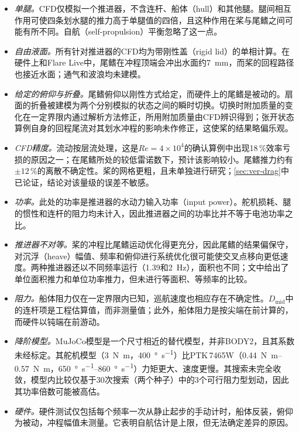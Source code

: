 \begin{itemize}
  \item \emph{单腿。}CFD仅模拟一个推进器，不含连杆、船体（hull）和其他腿。腿间相互作用可使四条划水腿的推力高于单腿值的四倍\cite{Wang2025}，且这种作用在桨与尾鳍之间可能有所不同。自航（self-propulsion）平衡忽略了这一点。
  \item \emph{自由液面。}所有针对推进器的CFD均为带刚性盖（rigid lid）的单相计算。在硬件上和Flare Live中，尾鳍在冲程顶端会冲出水面约\SI{7}{\milli\metre}，而桨的回程路径也接近水面；通气和波浪均未建模。
  \item \emph{给定的俯仰与折叠。}尾鳍俯仰以刚性方式给定，而硬件上的尾鳍是被动的。扇面的折叠被建模为两个分别模拟的状态之间的瞬时切换。切换时附加质量的变化在一定界限内通过解析方法修正，所用附加质量由CFD辨识得到；张开状态算例自身的回程尾流对其划水冲程的影响未作修正，这使桨的结果略偏乐观。
  \item \emph{CFD精度。}流动按层流处理，这是$\mathit{Re}=4\times10^4$的确认算例中出现18\,\%效率亏损的原因之一；在尾鳍所处的较低雷诺数下，预计该影响较小。尾鳍推力约有$\pm12$\,\%的离散不确定性。桨的网格更粗，且未单独进行研究；\cref{sec:ver-drag}中已论证，结论对该量级的误差不敏感。
  \item \emph{功率。}此处的功率是推进器的水动力输入功率（input power）。舵机损耗、腿的惯性和连杆的阻力均未计入，因此推进器之间的功率比并不等于电池功率之比。
  \item \emph{推进器不对等。}桨的冲程比尾鳍运动优化得更充分，因此尾鳍的结果偏保守，对沉浮（heave）幅值、频率和俯仰进行系统优化很可能使交叉点移向更低速度。两种推进器还以不同频率运行（\SI{1.39}{}和\SI{2}{\hertz}），面积也不同；文中给出了单位面积推力和单位功率推力，但未进行等面积、等频率的比较。
  \item \emph{阻力。}船体阻力仅在一定界限内已知，巡航速度也相应存在不确定性。$D_\text{mid}$中的连杆项是工程估算值，而非测量值；此外，船体阻力是按尖端在前计算的，而硬件以钝端在前游动。
  \item \emph{降阶模型。}MuJoCo模型是一个尺寸相近的替代模型，并非BODY2，且其系数未经标定。其舵机模型（\SI{3}{\newton\metre}，\SI{400}{\degree\per\second}）比PTK\,7465W（\SIrange{0.44}{0.57}{\newton\metre}，\SIrange{650}{860}{\degree\per\second}）力矩更大、速度更慢。其搜索未完全收敛，模型内比较仅基于30次搜索（两个种子）中的3个可行阻力型划动，因此其功率倍数可能被高估。
  \item \emph{硬件。}硬件测试仅包括每个频率一次从静止起步的手动计时，船体反装，俯仰为被动，冲程幅值未测量。它表明自航估计是上限，但无法确定差异的原因。
\end{itemize}
